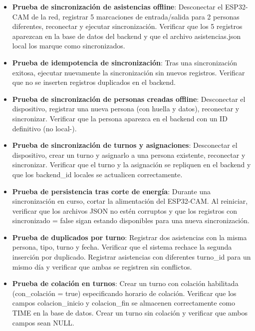 \begin{itemize}
    \item \textbf{Prueba de sincronización de asistencias offline}: Desconectar el ESP32-CAM de la red, registrar 5 marcaciones de entrada/salida para 2 personas diferentes, reconectar y ejecutar sincronización. Verificar que los 5 registros aparezcan en la base de datos del backend y que el archivo asistencias.json local los marque como sincronizados.

    \item \textbf{Prueba de idempotencia de sincronización}: Tras una sincronización exitosa, ejecutar nuevamente la sincronización sin nuevos registros. Verificar que no se inserten registros duplicados en el backend.

    \item \textbf{Prueba de sincronización de personas creadas offline}: Desconectar el dispositivo, registrar una nueva persona (con huella y datos), reconectar y sincronizar. Verificar que la persona aparezca en el backend con un ID definitivo (no local-).

    \item \textbf{Prueba de sincronización de turnos y asignaciones}: Desconectar el dispositivo, crear un turno y asignarlo a una persona existente, reconectar y sincronizar. Verificar que el turno y la asignación se repliquen en el backend y que los backend\_id locales se actualicen correctamente.

    \item \textbf{Prueba de persistencia tras corte de energía}: Durante una sincronización en curso, cortar la alimentación del ESP32-CAM. Al reiniciar, verificar que los archivos JSON no estén corruptos y que los registros con sincronizado = false sigan estando disponibles para una nueva sincronización.

    \item \textbf{Prueba de duplicados por turno}: Registrar dos asistencias con la misma persona, tipo, turno y fecha. Verificar que el sistema rechace la segunda inserción por duplicado. Registrar asistencias con diferentes turno\_id para un mismo día y verificar que ambas se registren sin conflictos.

    \item \textbf{Prueba de colación en turnos}: Crear un turno con colación habilitada (con\_colación = true) especificando horario de colación. Verificar que los campos colacion\_inicio y colacion\_fin se almacenen correctamente como TIME en la base de datos. Crear un turno sin colación y verificar que ambos campos sean NULL.


\end{itemize}
